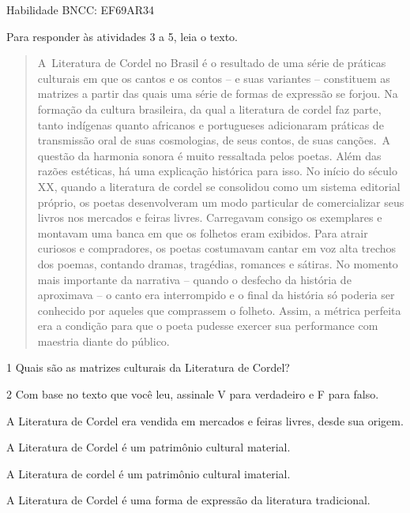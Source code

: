 \begin{escolha}
{Habilidade BNCC: EF69AR34}

Para responder às atividades 3 a 5, leia o texto.

\begin{quote}
A~Literatura de Cordel no Brasil é o resultado de uma série de
práticas culturais em que os cantos e os contos -- e suas variantes --
constituem as matrizes a partir das quais uma série de formas de
expressão se forjou. Na formação da cultura brasileira, da qual a
literatura de cordel faz parte, tanto indígenas quanto africanos e
portugueses adicionaram práticas de transmissão oral de suas
cosmologias, de seus contos, de suas canções.~A questão da harmonia
sonora é muito ressaltada pelos poetas. Além das razões estéticas, há
uma explicação histórica para isso. No início do século XX, quando a
literatura de cordel se consolidou como um sistema editorial próprio, os
poetas desenvolveram um modo particular de comercializar seus livros nos
mercados e feiras livres. Carregavam consigo os exemplares e montavam
uma banca em que os folhetos eram exibidos. Para atrair curiosos e
compradores, os poetas costumavam cantar em voz alta trechos dos poemas,
contando dramas, tragédias, romances e sátiras. No momento mais
importante da narrativa -- quando o desfecho da história de aproximava
-- o canto era interrompido e o final da história só poderia ser
conhecido por aqueles que comprassem o folheto. Assim, a métrica
perfeita era a condição para que o poeta pudesse exercer sua performance
com maestria diante do público.

\end{quote}

\num{1}  Quais são as matrizes culturais da Literatura de Cordel?


\num{2}  Com base no texto que você leu, assinale V para verdadeiro e F para falso.

\begin{boxlist}
\item A Literatura de Cordel era vendida em mercados e feiras livres, desde sua origem.
\item A Literatura de Cordel é um patrimônio cultural material.
\item A Literatura de cordel é um patrimônio cultural imaterial.
\item A Literatura de Cordel é uma forma de expressão da literatura tradicional.
\end{boxlist}


\end{escolha}
